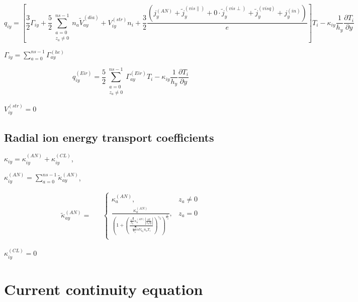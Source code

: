 \documentclass[a4paper,10pt]{report}
\begin{document}

\begin{equation*}
q_{iy} = \left[
	\frac{3}{2} \Gamma_{iy} +
	\frac{5}{2} \sum \limits^{ns-1}_{\substack{a = 0 \\ z_a \neq 0}} n_a \widetilde V_{ay}^{(dia)} +
	V_{iy}^{(str)} n_i +
	\frac 3 2 \frac{\left(
		j_y^{(AN)} + \widetilde j_y^{(vis \parallel)} + 0 \cdot \widetilde j_y^{(vis \perp)} + \widetilde j_y^{(visq)} + j_y^{(in)}
	\right)} e
\right] T_i - \kappa_{iy} \frac{1}{h_y} \frac{\partial T_i}{\partial y}
\end{equation*}

$\Gamma_{iy} = \sum \limits_{a = 0}^{ns -1} \Gamma_{ay}^{(he)}$

\begin{equation*}
q_{iy}^{(Eir)} =
\frac{5}{2} \sum \limits^{ns-1}_{\substack{a = 0 \\ z_a \neq 0}} \Gamma_{ay}^{(Eir)} T_i -
\kappa_{iy} \frac{1}{h_y} \frac{\partial T_i}{\partial y}
\end{equation*}

$V_{iy}^{(str)} = 0$

\subsection{Radial ion energy transport coefficients}

$\kappa_{iy} = \kappa_{iy}^{(AN)} + \kappa_{iy}^{(CL)}$,

$\kappa_{iy}^{(AN)} = \sum \limits_{a=0}^{ns-1} \widetilde \kappa_{ay}^{(AN)}$,

\begin{equation*}
\begin{matrix}
\widetilde \kappa_{ay}^{(AN)} = &
& \left\{
\begin{matrix}
\kappa_a^{(AN)}, & z_a \neq 0 \\
\frac {\kappa_a^{(AN)}}
{\left(
	1 + \left(
			\frac{\frac{\sqrt{g}}{h_y} \kappa_a^{(AN)} \left| \frac{\partial T_i}{h_y \partial y} \right|}
			{\frac{\sqrt{g}}{h_y} \alpha V_{h_a} n_a T_i}
		\right)^{\gamma_2}
\right)^{\frac 1{\gamma_2}}}
, & z_a = 0 \\
\end{matrix} \right.
\end{matrix}
\end{equation*}

$\kappa_{iy}^{(CL)} = 0$

\section{Current continuity equation}
\end{document}
